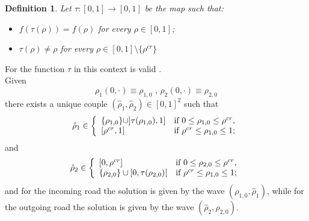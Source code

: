 \documentclass[12pt,subeqn]{article}
\numberwithin{equation}{section}
\newtheorem{theorem}{Theorem}
\newtheorem{definition}{Definition}[section]
\begin{document}
\begin{definition}
	Let $\tau:[0,1]\rightarrow[0,1]$ be the map such that:
	\begin{itemize}
		\item $f(\tau(\rho))=f(\rho)$ for every $\rho\in [0,1]$;
		\item $\tau(\rho)\neq\rho$ for every $\rho\in[0,1]\setminus\{\rho^{cr}\}$
	\end{itemize}
\end{definition}
For the function $\tau$ in this context is valid \cite[Proposition 4.3.2.]{garavello2006traffic}.\\
Given $$\rho_1(0,\cdot)\equiv \rho_{1,0}\text{ , }\rho_2(0,\cdot)\equiv \rho_{2,0} $$ there exists a unique couple $(\hat{\rho}_1 ,\hat{\rho}_2)\in[0,1]^2$ such that
	\begin{equation}
		\hat{\rho}_1\in\left\{
		\begin{array}{ll}
		\{\rho_{1,0}\}\cup]\tau(\rho_{1,0}),1] &\hbox{if}~0 \leq \rho_{1,0}\leq\rho^{cr} ,\\
		\left[\rho^{cr},1\right] &\hbox{if}~\rho^{cr} \leq \rho_{1,0}\leq 1;
		\end{array}
		\right.
		\label{eq:rho_1}
	\end{equation}
	and
	\begin{equation}
		\hat{\rho}_2\in\left\{
		\begin{array}{ll}
		\left[0,\rho^{cr}\right] &\hbox{if}~0 \leq \rho_{2,0}\leq\rho^{cr} ,\\		
		\{\rho_{2,0}\}\cup[0,\tau(\rho_{2,0})[ &\hbox{if}~\rho^{cr} \leq \rho_{1,0}\leq 1;
		\end{array}
		\right.
		\label{eq:rho_2}
	\end{equation}
and for the incoming road the solution is given by the wave $(\rho_{1,0},\hat{\rho}_1)$, while for the outgoing road the solution is given by the wave $(\hat{\rho}_2,\rho_{2,0})$.
\end{document}
